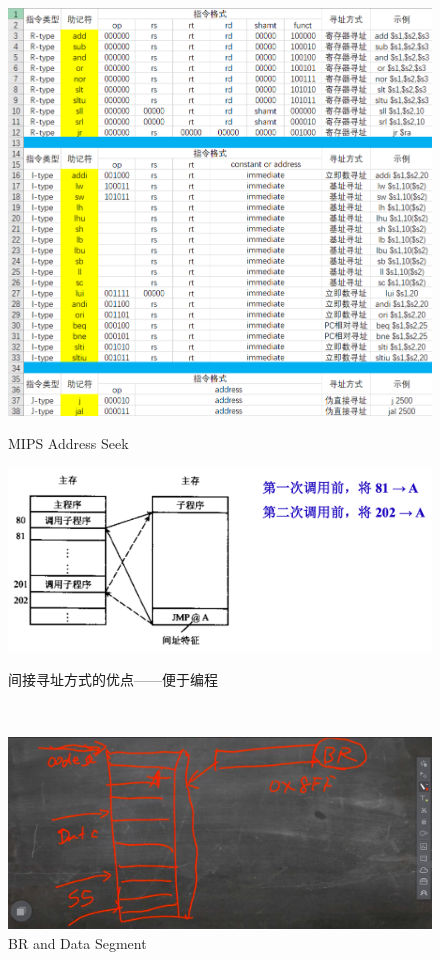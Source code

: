 \documentclass[]{report}
\begin{document}
\begin{figure}[h]
\begin{minipage}{20em}
				\includegraphics[scale = 0.32]{images/address_seeking_in_MPIS.png}
				\caption{MIPS Address Seek}
			\end{minipage}
			\qquad
			\begin{minipage}{20em}
				\centering
				\begin{minipage}{20em}
					\centering
					\includegraphics[scale = 0.12]{images/indirect_addressing.png}
					\caption{\dag 间接寻址方式的优点——便于编程}
				\end{minipage}
				\\[7pt]
				\begin{minipage}{20em}
					\centering
					\includegraphics[scale = 0.12]{images/BR_and_Data_Segment.png}
					\caption{BR and Data Segment}
				\end{minipage}
			\end{minipage}
		\end{figure}\par
\end{document}
